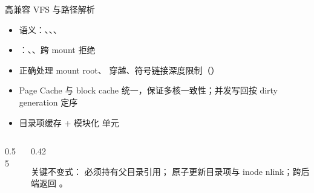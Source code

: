 \documentclass[aspectratio=1610]{beamer}
\begin{document}
\begin{frame}{高兼容 VFS 与路径解析}
    \begin{itemize}
        \item {} 语义：、、、
        \item {}：、、跨 mount 拒绝
        \item 正确处理 mount root、 穿越、符号链接深度限制（）
        \item Page Cache 与 block cache 统一，保证多核一致性；并发写回按 dirty generation 定序
        \item {} 目录项缓存 + 模块化  单元
    \end{itemize}
    \vspace{0.3em}
    \begin{columns}[t]
        \begin{column}{0.55\textwidth}
        \end{column}
        \begin{column}{0.42\textwidth}
            \begin{a20keybox}
                \footnotesize 关键不变式： 必须持有父目录引用； 原子更新目录项与 inode nlink；跨后端返回 。
            \end{a20keybox}
        \end{column}
    \end{columns}
\end{frame}
\end{document}
